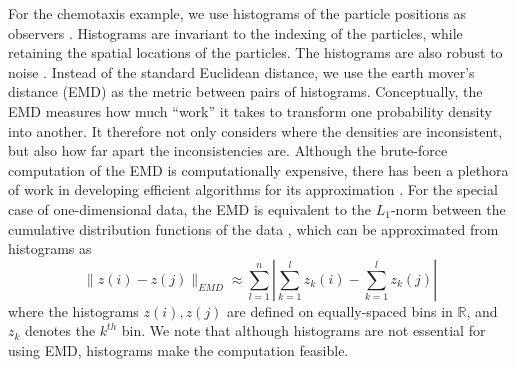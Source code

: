 \documentclass[preprint]{elsarticle}
\begin{document}
For the chemotaxis example, we use histograms of the particle positions as observers \cite{talmon2013empirical}. 
%
Histograms are invariant to the indexing of the particles, while retaining the spatial locations of the particles.
%
The histograms are also robust to noise \cite{talmon2013empirical}. 
%
Instead of the standard Euclidean distance, we use the earth mover's distance (EMD) \cite{rubner2000earth} as the metric between pairs of histograms. 
%
Conceptually, the EMD measures how much ``work'' it takes to transform one probability density into another.
%
It therefore not only considers where the densities are inconsistent, but also how far apart the inconsistencies are.
%
Although the brute-force computation of the EMD is computationally expensive, there has been a plethora of work in developing efficient algorithms for its approximation \cite{Pele-eccv2008, Pele-iccv2009}.
%
For the special case of one-dimensional data, the EMD is equivalent to the $L_1$-norm between the cumulative distribution functions of the data \cite{rubner2000perceptual}, which can be approximated from histograms as
\begin{equation}
\| z(i) - z(j) \|_{EMD} \approx \sum_{l=1}^{n} \left| \sum_{k=1}^l z_k(i) - \sum_{k=1}^l z_k(j) \right|
\end{equation}
where the histograms $z(i), z(j)$ are defined on equally-spaced bins in $\mathbb{R}$, and $z_k$ denotes the $k^{th}$ bin. 
%
We note that although histograms are not essential for using EMD, histograms make the computation feasible. 
\end{document}
